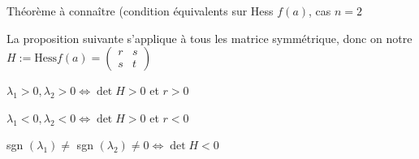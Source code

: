 \begin{parag}{Théorème à connaître (condition équivalents sur Hess $f\left(a\right)$, cas $n = 2$}
    \begin{theoreme}
    La proposition suivante s'applique à tous les matrice symmétrique, donc on notre $H := \text{Hess} f\left(a\right) = \begin{pmatrix}r & s \\ s & t \end{pmatrix}$
    \begin{itzemize}
    \item $\lambda_1 > 0, \lambda_2 > 0 \iff \det H > 0$ et $r > 0$
    \item $\lambda_1 <0 , \lambda_2 < 0 \iff  \det H > 0$ et $r < 0$
    \item sgn $\left(\lambda_1\right) \neq $ sgn $\left(\lambda_2\right) \neq 0 \iff \det H < 0$
    \end{itzemize}
    
    \end{theoreme}
    
\end{parag}
